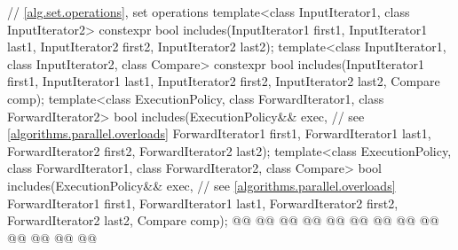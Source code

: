 \begin{codeblock}
{  // \ref{alg.set.operations}, set operations
  template<class InputIterator1, class InputIterator2>
    constexpr bool includes(InputIterator1 first1, InputIterator1 last1,
                            InputIterator2 first2, InputIterator2 last2);
  template<class InputIterator1, class InputIterator2, class Compare>
    constexpr bool includes(InputIterator1 first1, InputIterator1 last1,
                            InputIterator2 first2, InputIterator2 last2,
                            Compare comp);
  template<class ExecutionPolicy, class ForwardIterator1, class ForwardIterator2>
    bool includes(ExecutionPolicy&& exec, // see \ref{algorithms.parallel.overloads}
                  ForwardIterator1 first1, ForwardIterator1 last1,
                  ForwardIterator2 first2, ForwardIterator2 last2);
  template<class ExecutionPolicy, class ForwardIterator1, class ForwardIterator2,
           class Compare>
    bool includes(ExecutionPolicy&& exec, // see \ref{algorithms.parallel.overloads}
                  ForwardIterator1 first1, ForwardIterator1 last1,
                  ForwardIterator2 first2, ForwardIterator2 last2,
                  Compare comp);
  @@
    @@
        @@
        @@
      @@
                    @@
    @@
        @@
        @@
          @@
      @@
                    @@
  @\added{\}}@

}
\end{codeblock}
